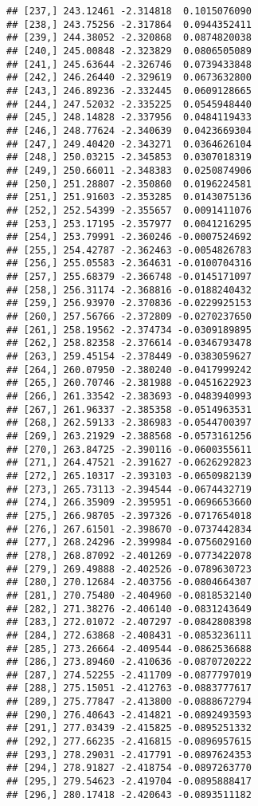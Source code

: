 \documentclass[]{book}
\theoremstyle{definition}
\theoremstyle{definition}
\theoremstyle{definition}
\theoremstyle{remark}
\begin{document}
\begin{verbatim}
## [237,] 243.12461 -2.314818  0.1015076090
## [238,] 243.75256 -2.317864  0.0944352411
## [239,] 244.38052 -2.320868  0.0874820038
## [240,] 245.00848 -2.323829  0.0806505089
## [241,] 245.63644 -2.326746  0.0739433848
## [242,] 246.26440 -2.329619  0.0673632800
## [243,] 246.89236 -2.332445  0.0609128665
## [244,] 247.52032 -2.335225  0.0545948440
## [245,] 248.14828 -2.337956  0.0484119433
## [246,] 248.77624 -2.340639  0.0423669304
## [247,] 249.40420 -2.343271  0.0364626104
## [248,] 250.03215 -2.345853  0.0307018319
## [249,] 250.66011 -2.348383  0.0250874906
## [250,] 251.28807 -2.350860  0.0196224581
## [251,] 251.91603 -2.353285  0.0143075136
## [252,] 252.54399 -2.355657  0.0091411076
## [253,] 253.17195 -2.357977  0.0041216295
## [254,] 253.79991 -2.360246 -0.0007524692
## [255,] 254.42787 -2.362463 -0.0054826783
## [256,] 255.05583 -2.364631 -0.0100704316
## [257,] 255.68379 -2.366748 -0.0145171097
## [258,] 256.31174 -2.368816 -0.0188240432
## [259,] 256.93970 -2.370836 -0.0229925153
## [260,] 257.56766 -2.372809 -0.0270237650
## [261,] 258.19562 -2.374734 -0.0309189895
## [262,] 258.82358 -2.376614 -0.0346793478
## [263,] 259.45154 -2.378449 -0.0383059627
## [264,] 260.07950 -2.380240 -0.0417999242
## [265,] 260.70746 -2.381988 -0.0451622923
## [266,] 261.33542 -2.383693 -0.0483940993
## [267,] 261.96337 -2.385358 -0.0514963531
## [268,] 262.59133 -2.386983 -0.0544700397
## [269,] 263.21929 -2.388568 -0.0573161256
## [270,] 263.84725 -2.390116 -0.0600355611
## [271,] 264.47521 -2.391627 -0.0626292823
## [272,] 265.10317 -2.393103 -0.0650982139
## [273,] 265.73113 -2.394544 -0.0674432719
## [274,] 266.35909 -2.395951 -0.0696653660
## [275,] 266.98705 -2.397326 -0.0717654018
## [276,] 267.61501 -2.398670 -0.0737442834
## [277,] 268.24296 -2.399984 -0.0756029160
## [278,] 268.87092 -2.401269 -0.0773422078
## [279,] 269.49888 -2.402526 -0.0789630723
## [280,] 270.12684 -2.403756 -0.0804664307
## [281,] 270.75480 -2.404960 -0.0818532140
## [282,] 271.38276 -2.406140 -0.0831243649
## [283,] 272.01072 -2.407297 -0.0842808398
## [284,] 272.63868 -2.408431 -0.0853236111
## [285,] 273.26664 -2.409544 -0.0862536688
## [286,] 273.89460 -2.410636 -0.0870720222
## [287,] 274.52255 -2.411709 -0.0877797019
## [288,] 275.15051 -2.412763 -0.0883777617
## [289,] 275.77847 -2.413800 -0.0888672794
## [290,] 276.40643 -2.414821 -0.0892493593
## [291,] 277.03439 -2.415825 -0.0895251332
## [292,] 277.66235 -2.416815 -0.0896957615
## [293,] 278.29031 -2.417791 -0.0897624353
## [294,] 278.91827 -2.418754 -0.0897263770
## [295,] 279.54623 -2.419704 -0.0895888417
## [296,] 280.17418 -2.420643 -0.0893511182

\end{verbatim}
\end{document}
